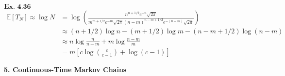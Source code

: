 \documentclass{article}
\begin{document}
\vspace{0.2in}
${\textbf{Ex. 4.36}}$
\begin{align*}
\mathbb{E}[T_N] \approx \log N &= \log\left(\frac{n^{n+1/2}e^{-n}\sqrt{2\pi}}{m^{m+1/2}e^{-m}\sqrt{2\pi}(n-m)^{n-m+1/2}e^{-(n-m)}\sqrt{2\pi}}\right)\\
&\approx (n+1/2)\log n - (m+1/2)\log m - (n-m+1/2)\log(n-m)\\
&\approx n\log\frac{n}{n-m} + m\log\frac{n-m}{m}\\
& = m\left[c\log\left(\frac{c}{c-1}\right) + \log(c-1)\right]
\end{align*}

\vspace{0.2in}
\begin{comment}
${\textbf{Ex. 4.37}}$

\vspace{0.2in}
${\textbf{Ex. 4.38}}$

\vspace{0.2in}
${\textbf{Ex. 4.39}}$

\vspace{0.2in}
${\textbf{Ex. 4.40}}$

\vspace{0.2in}
${\textbf{Ex. 4.41}}$

\vspace{0.2in}
${\textbf{Ex. 4.42}}$

\vspace{0.2in}
${\textbf{Ex. 4.43}}$

\vspace{0.2in}
${\textbf{Ex. 4.44}}$

\vspace{0.2in}
${\textbf{Ex. 4.45}}$

\vspace{0.2in}
${\textbf{Ex. 4.46}}$

\vspace{0.2in}
\end{comment}
\clearpage
\begin{center}
    \textbf{\large{5. Continuous-Time Markov Chains}}
\end{center}
\end{document}
